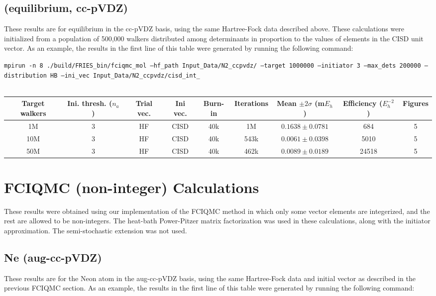\documentclass[12pt, landscape]{article}
\begin{document}
\subsection*{ (equilibrium, cc-pVDZ)}
These results are for equilibrium  in the cc-pVDZ basis, using the same Hartree-Fock data described above. These calculations were initialized from a population of 500,000 walkers distributed among determinants in proportion to the values of elements in the CISD unit vector. As an example, the results in the first line of this table were generated by running the following command:

\texttt{mpirun -n 8 ./build/FRIES\_bin/fciqmc\_mol --hf\_path Input\_Data/N2\_ccpvdz/ --target 1000000 --initiator 3 --max\_dets 200000 --distribution HB --ini\_vec Input\_Data/N2\_ccpvdz/cisd\_int\_}
\\~\\
\begin{tabular}{c|c|c|c|c|c|c|c|c}
Target walkers & Ini. thresh. ($n_a$) & Trial vec. & Ini vec. & Burn-in & Iterations & Mean $\pm 2 \sigma$ (m$E_h$) & Efficiency ($E_h^{-2}$) & Figures \\ \hline
1M & 3 & HF & CISD & 40k & 1M & $0.1638 \pm 0.0781$ & 684 & 5\\
10M & 3 & HF & CISD & 40k & 543k & $0.0061 \pm 0.0398$ & 5010 & 5\\
50M & 3 & HF & CISD & 40k & 462k & $0.0089 \pm 0.0189$ & 24518 & 5 \\
\end{tabular}


\section*{FCIQMC (non-integer) Calculations}
These results were obtained using our implementation of the FCIQMC method in which only some vector elements are integerized, and the rest are allowed to be non-integers. The heat-bath Power-Pitzer matrix factorization was used in these calculations, along with the initiator approximation. The semi-stochastic extension was not used.

\subsection*{Ne (aug-cc-pVDZ)}
These results are for the Neon atom in the aug-cc-pVDZ basis, using the same Hartree-Fock data and initial vector as described in the previous FCIQMC section. As an example, the results in the first line of this table were generated by running the following command:
\end{document}
